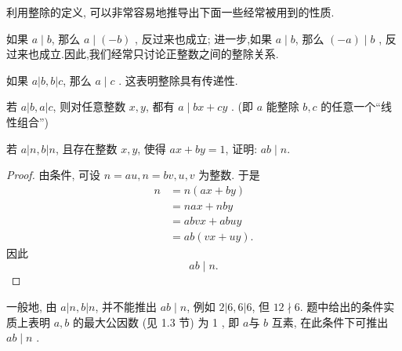 利用整除的定义, 可以非常容易地推导出下面一些经常被用到的性质.

\begin{property}
	如果 $a \mid b$, 那么 $a \mid(-b)$ , 反过来也成立; 进一步,如果 $a \mid b$, 那么 $(-a) \mid b$ , 反过来也成立.因此,我们经常只讨论正整数之间的整除关系.
\end{property}


\begin{property}
	如果 $a|b, b| c$, 那么 $a \mid c$ . 这表明整除具有传递性.
\end{property}

\begin{property}\label{prop:整除的性质——“线性组合”}
	若 $a|b, a| c$, 则对任意整数 $x ,  y$, 都有 $a \mid b x+c y$ . (即 $a$ 能整除 $b ,  c$ 的任意一个“线性组合”)
\end{property}

\begin{example}\label{ex:整除的概念与基本性质-例1}
	若 $a|n, b| n$, 且存在整数 $x ,  y$, 使得 $a x+b y=1$, 证明: $a b \mid n$.
\end{example}
\begin{proof}
	由条件, 可设 $n=a u, n=b v, u ,  v$ 为整数. 于是
	\begin{align*}
		n & =n(a x+b y)      \\
		  & =n a x+n b y     \\
		  & =a b v x+a b u y \\
		  & =a b(v x+u y).
	\end{align*}
	因此
	\begin{equation*}
		a b \mid n.
	\end{equation*}
\end{proof}
\begin{note}
	一般地, 由 $a|n, b| n$, 并不能推出 $a b \mid n$, 例如 $2|6,6| 6$, 但 $12 \nmid 6$. 题中给出的条件实质上表明 $a ,  b$ 的最大公因数 (见 1.3 节) 为 1 , 即 $a$与 $b$ 互素, 在此条件下可推出 $a b \mid n$ .
\end{note}

